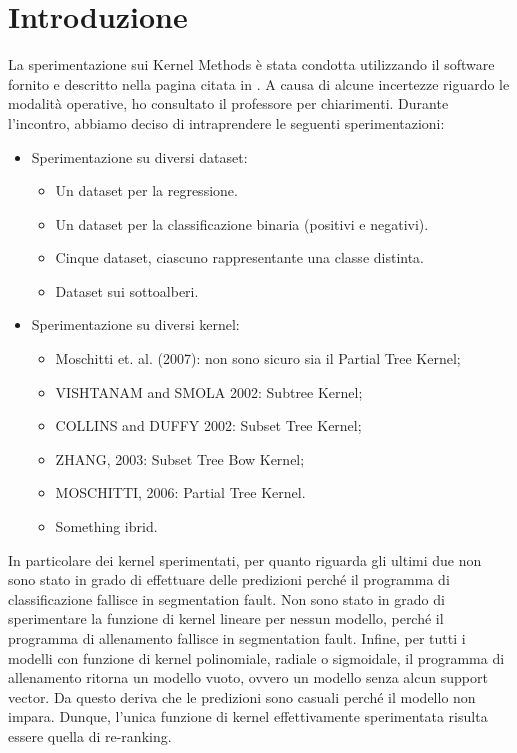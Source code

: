 \section{Introduzione}

La sperimentazione sui Kernel Methods è stata condotta utilizzando il software 
fornito e descritto nella pagina citata in \cite{kernel}. A causa di alcune 
incertezze riguardo le modalità operative, ho consultato il professore per 
chiarimenti. Durante l'incontro, abbiamo deciso di intraprendere le seguenti 
sperimentazioni:

\begin{itemize}
    \item Sperimentazione su diversi dataset:
    \begin{itemize}
        \item Un dataset per la regressione.
        \item Un dataset per la classificazione binaria (positivi e negativi).
        \item Cinque dataset, ciascuno rappresentante una classe distinta.
        \item Dataset sui sottoalberi.
    \end{itemize}
\item Sperimentazione su diversi kernel:
    \begin{itemize}
        \item Moschitti et. al. (2007): non sono sicuro sia il Partial Tree
            Kernel;

        \item VISHTANAM and SMOLA 2002: Subtree Kernel;

        \item COLLINS and DUFFY 2002: Subset Tree Kernel;

        \item ZHANG, 2003: Subset Tree Bow Kernel;

        \item MOSCHITTI, 2006: Partial Tree Kernel.

        \item Something ibrid.
    \end{itemize}
\end{itemize}

In particolare dei kernel sperimentati, per quanto riguarda gli ultimi due non 
sono stato in grado di effettuare delle predizioni perché il programma di 
classificazione fallisce in segmentation fault. 
Non sono stato in grado di sperimentare la funzione
di kernel lineare per nessun modello, perché il programma di allenamento
fallisce in segmentation fault. Infine, per tutti i modelli con funzione di
kernel polinomiale, radiale o sigmoidale, il programma di allenamento ritorna un
modello vuoto, ovvero un modello senza alcun support vector. Da questo
deriva che le predizioni sono casuali perché il modello non impara. Dunque,
l'unica funzione di kernel effettivamente sperimentata risulta essere quella di
re-ranking.
